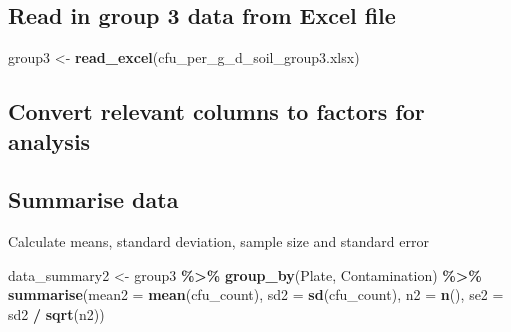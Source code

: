\documentclass[
]{article}
\newenvironment{Shaded}{\begin{snugshade}}{\end{snugshade}}
\newcommand{\AttributeTok}[1]{\textcolor[rgb]{0.13,0.29,0.53}{#1}}
\newcommand{\CommentTok}[1]{\textcolor[rgb]{0.56,0.35,0.01}{\textit{#1}}}
\newcommand{\FunctionTok}[1]{\textcolor[rgb]{0.13,0.29,0.53}{\textbf{#1}}}
\newcommand{\NormalTok}[1]{#1}
\newcommand{\OtherTok}[1]{\textcolor[rgb]{0.56,0.35,0.01}{#1}}
\newcommand{\SpecialCharTok}[1]{\textcolor[rgb]{0.81,0.36,0.00}{\textbf{#1}}}
\newcommand{\StringTok}[1]{\textcolor[rgb]{0.31,0.60,0.02}{#1}}
\begin{document}
\subsection{Read in group 3 data from Excel
file}\label{read-in-group-3-data-from-excel-file}

\begin{Shaded}
\begin{Highlighting}[]
\NormalTok{group3 }\OtherTok{\textless{}{-}} \FunctionTok{read\_excel}\NormalTok{(}\StringTok{\textquotesingle{}cfu\_per\_g\_d\_soil\_group3.xlsx\textquotesingle{}}\NormalTok{)}
\end{Highlighting}
\end{Shaded}

\subsection{Convert relevant columns to factors for
analysis}\label{convert-relevant-columns-to-factors-for-analysis}

\begin{Shaded}
\end{Shaded}

\subsection{Summarise data}\label{summarise-data-1}

Calculate means, standard deviation, sample size and standard error

\begin{Shaded}
\begin{Highlighting}[]
\NormalTok{data\_summary2 }\OtherTok{\textless{}{-}}\NormalTok{ group3 }\SpecialCharTok{\%\textgreater{}\%}
  \FunctionTok{group\_by}\NormalTok{(Plate, Contamination) }\SpecialCharTok{\%\textgreater{}\%}
  \FunctionTok{summarise}\NormalTok{(}\AttributeTok{mean2 =} \FunctionTok{mean}\NormalTok{(cfu\_count),}
            \AttributeTok{sd2 =} \FunctionTok{sd}\NormalTok{(cfu\_count),}
            \AttributeTok{n2 =} \FunctionTok{n}\NormalTok{(),}
            \AttributeTok{se2 =}\NormalTok{ sd2 }\SpecialCharTok{/} \FunctionTok{sqrt}\NormalTok{(n2))}
\end{Highlighting}
\end{Shaded}
\end{document}
